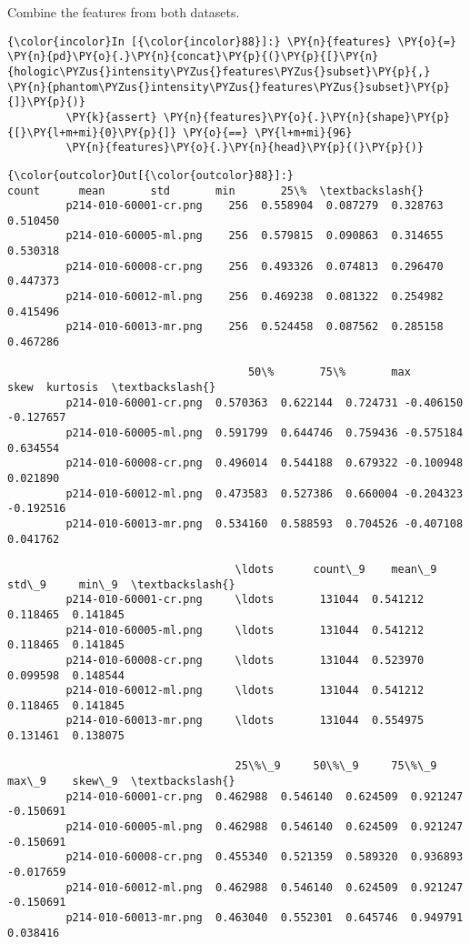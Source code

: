     Combine the features from both datasets.

    \begin{Verbatim}[commandchars=\\\{\}]
{\color{incolor}In [{\color{incolor}88}]:} \PY{n}{features} \PY{o}{=} \PY{n}{pd}\PY{o}{.}\PY{n}{concat}\PY{p}{(}\PY{p}{[}\PY{n}{hologic\PYZus{}intensity\PYZus{}features\PYZus{}subset}\PY{p}{,} \PY{n}{phantom\PYZus{}intensity\PYZus{}features\PYZus{}subset}\PY{p}{]}\PY{p}{)}
         \PY{k}{assert} \PY{n}{features}\PY{o}{.}\PY{n}{shape}\PY{p}{[}\PY{l+m+mi}{0}\PY{p}{]} \PY{o}{==} \PY{l+m+mi}{96}
         \PY{n}{features}\PY{o}{.}\PY{n}{head}\PY{p}{(}\PY{p}{)}
\end{Verbatim}

            \begin{Verbatim}[commandchars=\\\{\}]
{\color{outcolor}Out[{\color{outcolor}88}]:}                        count      mean       std       min       25\%  \textbackslash{}
         p214-010-60001-cr.png    256  0.558904  0.087279  0.328763  0.510450
         p214-010-60005-ml.png    256  0.579815  0.090863  0.314655  0.530318
         p214-010-60008-cr.png    256  0.493326  0.074813  0.296470  0.447373
         p214-010-60012-ml.png    256  0.469238  0.081322  0.254982  0.415496
         p214-010-60013-mr.png    256  0.524458  0.087562  0.285158  0.467286

                                     50\%       75\%       max      skew  kurtosis  \textbackslash{}
         p214-010-60001-cr.png  0.570363  0.622144  0.724731 -0.406150 -0.127657
         p214-010-60005-ml.png  0.591799  0.644746  0.759436 -0.575184  0.634554
         p214-010-60008-cr.png  0.496014  0.544188  0.679322 -0.100948  0.021890
         p214-010-60012-ml.png  0.473583  0.527386  0.660004 -0.204323 -0.192516
         p214-010-60013-mr.png  0.534160  0.588593  0.704526 -0.407108  0.041762

                                   \ldots      count\_9    mean\_9     std\_9     min\_9  \textbackslash{}
         p214-010-60001-cr.png     \ldots       131044  0.541212  0.118465  0.141845
         p214-010-60005-ml.png     \ldots       131044  0.541212  0.118465  0.141845
         p214-010-60008-cr.png     \ldots       131044  0.523970  0.099598  0.148544
         p214-010-60012-ml.png     \ldots       131044  0.541212  0.118465  0.141845
         p214-010-60013-mr.png     \ldots       131044  0.554975  0.131461  0.138075

                                   25\%\_9     50\%\_9     75\%\_9     max\_9    skew\_9  \textbackslash{}
         p214-010-60001-cr.png  0.462988  0.546140  0.624509  0.921247 -0.150691
         p214-010-60005-ml.png  0.462988  0.546140  0.624509  0.921247 -0.150691
         p214-010-60008-cr.png  0.455340  0.521359  0.589320  0.936893 -0.017659
         p214-010-60012-ml.png  0.462988  0.546140  0.624509  0.921247 -0.150691
         p214-010-60013-mr.png  0.463040  0.552301  0.645746  0.949791  0.038416


\end{Verbatim}
